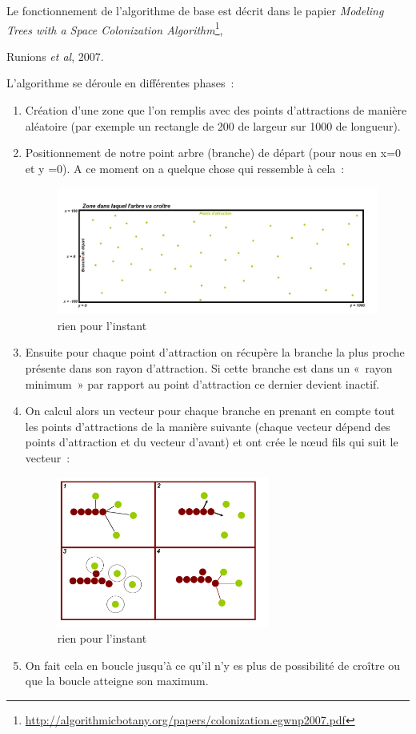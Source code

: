 \documentclass[a4paper]{article}
\begin{document}
		Le fonctionnement de l’algorithme de base est décrit dans le papier \emph{Modeling Trees with a Space Colonization Algorithm}\footnote{\url{http://algorithmicbotany.org/papers/colonization.egwnp2007.pdf}}, {Runions \emph{et al}, 2007.
	
		L’algorithme se déroule en différentes  phases :
		\begin{enumerate}
			\item Création d’une zone que l’on remplis avec des points d’attractions de manière aléatoire (par exemple un rectangle de 200 de largeur sur 1000 de longueur). 
			\item Positionnement de notre point arbre (branche) de départ (pour nous en x=0 et y =0).
			A ce moment on a quelque chose qui ressemble à cela :
			\begin{figure}[!h]
				\centering
				\includegraphics[width=11cm]{./img/sc.jpg}
				\caption{rien pour l'instant}
			\end{figure}
			\item Ensuite pour chaque point d’attraction on récupère la branche la plus proche présente dans son rayon d’attraction. Si cette branche est dans un « rayon minimum » par rapport au point d’attraction ce dernier devient inactif.

			\item On calcul alors un vecteur pour chaque branche en prenant en compte tout les points d’attractions de la manière suivante (chaque vecteur dépend des points d’attraction et du vecteur d’avant) et ont crée le nœud fils qui suit le vecteur : 
			\begin{figure}[!h]
				\centering
				\includegraphics[width=7cm]{./img/sc2.jpg}
				\caption{rien pour l'instant}
			\end{figure}
			\item On fait cela en boucle jusqu’à ce qu’il n’y es plus de possibilité de croître ou que la boucle atteigne son maximum.
		\end{enumerate}


}
\end{document}
